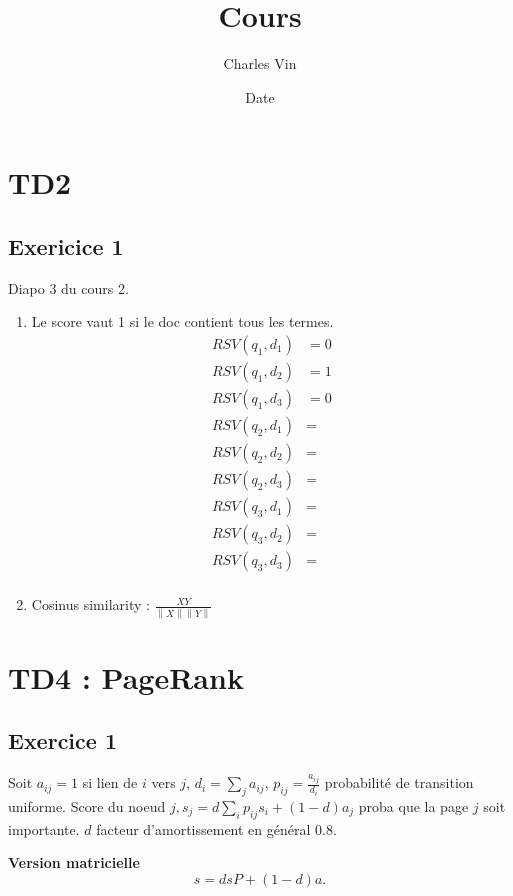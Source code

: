 \documentclass{article}
\title{Cours}
\author{Charles Vin}
\date{Date}
\theoremstyle{plain}%
\theoremstyle{definition}
\theoremstyle{remark}
\begin{document}
\maketitle

\section{TD2}
\subsection{Exericice 1}
Diapo 3 du cours 2.
\begin{enumerate}
    \item Le score vaut 1 si le doc contient tous les termes.\begin{align*}
        RSV(q_1, d_1) &= 0 \\
        RSV(q_1, d_2) &= 1 \\
        RSV(q_1, d_3) &= 0 \\
        RSV(q_2, d_1) &=  \\
        RSV(q_2, d_2) &=  \\
        RSV(q_2, d_3) &=  \\
        RSV(q_3, d_1) &=  \\
        RSV(q_3, d_2) &=  \\
        RSV(q_3, d_3) &=  \\
    \end{align*}
    \item Cosinus similarity : $ \frac{XY}{\left\| X \right\| \left\| Y \right\| } $ 
\end{enumerate}


\section{TD4 : PageRank}
\subsection{Exercice 1}
Soit $ a_{ij} = 1 $ si lien de $ i $ vers $ j $, $ d_i = \sum_{j}^{} a_{ij} $, $ p_{ij} = \frac{a_{ij}}{d_i} $ probabilité de transition uniforme.
Score du noeud $j,  s_j = d \sum_{i}^{} p_{ij} s_i  + (1 - d)a_j$ proba que la page $ j $ soit importante. $ d $ facteur d'amortissement en général $ 0.8 $.

\textbf{Version matricielle} 
\[
    s = dsP + (1 - d)a
.\]
\end{document}
